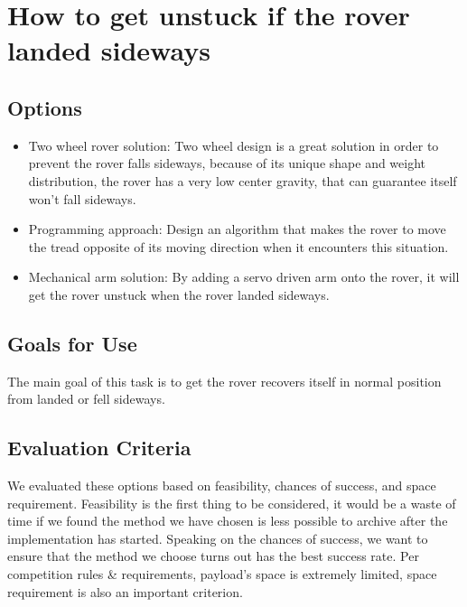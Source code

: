 \documentclass[10pt,letterpaper,onecolumn,journal]{IEEEtran}
\begin{document}
\section{How to get unstuck if the rover landed sideways}

\subsection{Options}
\begin{itemize}
	\item Two wheel rover solution: Two wheel design is a great solution in order to prevent the rover falls sideways, because of its unique shape and weight distribution, the rover has a very low center gravity, that can guarantee itself won't fall sideways.  
	\item Programming approach: Design an algorithm that makes the rover to move the tread opposite of its moving direction when it encounters this situation.
	\item Mechanical arm solution: By adding a servo driven arm onto the rover, it will get the rover unstuck when the rover landed sideways. 
	
\end{itemize}
\subsection{Goals for Use}
The main goal of this task is to get the rover recovers itself in normal position from landed or fell sideways. 
\subsection{Evaluation Criteria}
We evaluated these options based on feasibility, chances of success, and space requirement. Feasibility is the first thing to be considered, it would be a waste of time if we found the method we have chosen is less possible to archive after the implementation has started. Speaking on the chances of success, we want to ensure that the method we choose turns out has the best success rate. Per competition rules \& requirements, payload's space is extremely limited, space requirement is also an important criterion. 
\end{document}

